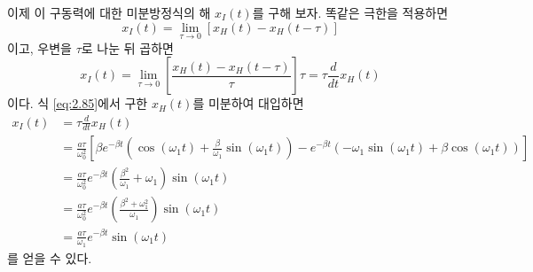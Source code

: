 \documentclass[chapter, oneside, b5paper]{oblivoir}
\theoremstyle{plain}
\theoremstyle{definition}
\theoremstyle{remark}
\begin{document}
이제 이 구동력에 대한 미분방정식의 해 $x_I(t)$를 구해 보자. 똑같은 극한을 적용하면
\begin{equation}
    x_I(t) = \lim_{\tau \to 0}[x_H(t)-x_H(t-\tau)]
\end{equation}이고, 우변을 $\tau$로 나눈 뒤 곱하면
\begin{equation}
    x_I(t) = \lim_{\tau \to 0}\left[\frac{x_H(t)-x_H(t-\tau)}{\tau}\right] \tau = \tau \frac{d}{dt}x_H(t) \label{eq:2.91}
\end{equation}이다. 식 \ref{eq:2.85}에서 구한 $x_H(t)$를 미분하여 대입하면
\begin{equation}
\begin{aligned}
    x_I(t) &= \tau \frac{d}{dt}x_H(t) \\
    &= \frac{a\tau}{\omega_0^2} \left[ \beta e^{-\beta t} \left( \cos(\omega_1 t) + \frac{\beta}{\omega_1} \sin(\omega_1 t) \right) - e^{-\beta t} \left( -\omega_1 \sin(\omega_1 t) + \beta \cos(\omega_1 t) \right) \right] \\
    &= \frac{a\tau}{\omega_0^2} e^{-\beta t} \left( \frac{\beta^2}{\omega_1} + \omega_1 \right) \sin(\omega_1 t) \\
    &= \frac{a\tau}{\omega_0^2} e^{-\beta t} \left( \frac{\beta^2 + \omega_1^2}{\omega_1} \right) \sin(\omega_1 t) \\
    &= \frac{a\tau}{\omega_1} e^{-\beta t} \sin(\omega_1 t)
\end{aligned} \label{eq:2.92}
\end{equation}를 얻을 수 있다.
\end{document}
